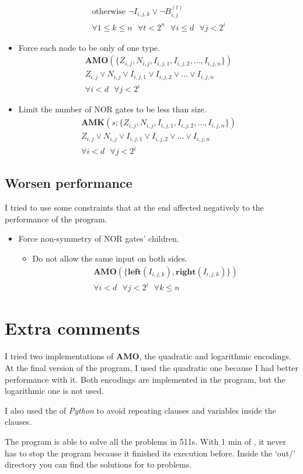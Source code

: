 \documentclass[letterpaper,10pt]{article}
\begin{document}
\begin{itemize}
\begin{align*}
        \text{otherwise }\lnot I_{i,j,k} \lor \lnot B_{i,j}^{(t)} \\
        \forall 1 \leq k \leq n\text{ }\forall t  < 2^n\text{ }\forall i \leq d\text{ }\forall j < 2^i
    \end{align*}
    \item Force each node to be only of one type.
    \begin{align*}
        \mathbf{AMO}(\{Z_{i,j}, N_{i,j}, I_{i,j,1}, I_{i,j,2}, ..., I_{i,j,n}\})\\
        Z_{i,j} \lor N_{i,j} \lor I_{i,j,1} \lor I_{i,j,2} \lor ... \lor I_{i,j,n}\\
        \forall i < d\text{ }\forall j < 2^i
    \end{align*}
    \item Limit the number of NOR gates to be less than size.
    \begin{align*}
        \mathbf{AMK}(s; \{Z_{i,j}, N_{i,j}, I_{i,j,1}, I_{i,j,2}, ..., I_{i,j,n}\})\\
        Z_{i,j} \lor N_{i,j} \lor I_{i,j,1} \lor I_{i,j,2} \lor ... \lor I_{i,j,n}\\
        \forall i < d\text{ }\forall j < 2^i
    \end{align*}
\end{itemize}

\subsection{Worsen performance}
I tried to use some constraints that at the end affected negatively to the performance of the program.
\begin{itemize}
\item Force non-symmetry of NOR gates' children.
\begin{itemize}
    \item Do not allow the same input on both sides.
        \begin{align*}
            \mathbf{AMO}(\{\mathbf{left}(I_{i,j,k}), \mathbf{right}(I_{i,j,k})\}) \\
            \forall i < d\text{ }\forall j < 2^i\text{ }\forall k \leq n
        \end{align*}
\end{itemize}
\end{itemize}

\section{Extra comments}
I tried two implementations of \textbf{AMO}, the quadratic and logarithmic encodings. At the final version of the program, I used the quadratic one because I had better performance with it. Both encodings are implemented in the program, but the logarithmic one is not used. 

I also used the  of \textit{Python} to avoid repeating clauses and variables inside the clauses.

The program is able to solve all the problems in 511s. With 1 min of , it never has to stop the program because it finished its execution before. Inside the `out/' directory you can find the solutions for to problems.
\end{document}

